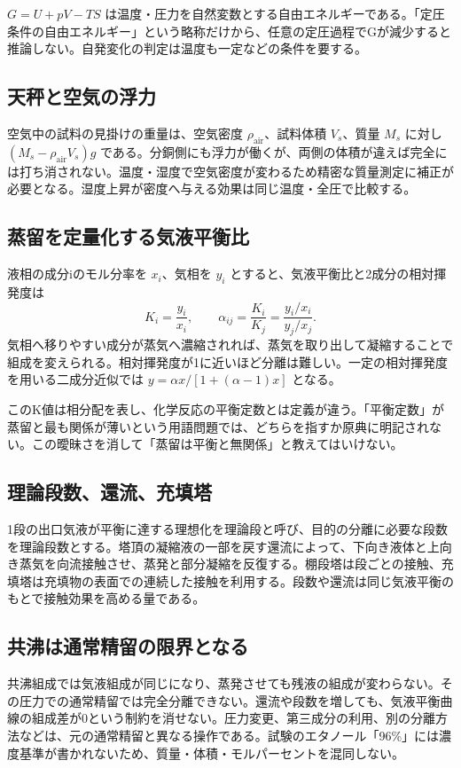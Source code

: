 \(G=U+pV-TS\) は温度・圧力を自然変数とする自由エネルギーである。「定圧条件の自由エネルギー」という略称だけから、任意の定圧過程でGが減少すると推論しない。自発変化の判定は温度も一定などの条件を要する\parencite{iupac_greenbook2012}。

\subsection{天秤と空気の浮力}
\label{theory:phase_sep:buoyancy}
空気中の試料の見掛けの重量は、空気密度 \(\rho_{\mathrm{air}}\)、試料体積 \(V_s\)、質量 \(M_s\) に対し \((M_s-\rho_{\mathrm{air}}V_s)g\) である。分銅側にも浮力が働くが、両側の体積が違えば完全には打ち消されない。温度・湿度で空気密度が変わるため精密な質量測定に補正が必要となる。湿度上昇が密度へ与える効果は同じ温度・全圧で比較する。

\subsection{蒸留を定量化する気液平衡比}
\label{theory:phase_sep:distillation}
液相の成分iのモル分率を \(x_i\)、気相を \(y_i\) とすると、気液平衡比と2成分の相対揮発度は
\[
 K_i=\frac{y_i}{x_i},\qquad
 \alpha_{ij}=\frac{K_i}{K_j}
 =\frac{y_i/x_i}{y_j/x_j}.
\]
気相へ移りやすい成分が蒸気へ濃縮されれば、蒸気を取り出して凝縮することで組成を変えられる。相対揮発度が1に近いほど分離は難しい。一定の相対揮発度を用いる二成分近似では \(y=\alpha x/[1+(\alpha-1)x]\) となる\parencite{nptel_distillation1}。

このK値は相分配を表し、化学反応の平衡定数とは定義が違う。「平衡定数」が蒸留と最も関係が薄いという用語問題では、どちらを指すか原典に明記されない。この曖昧さを消して「蒸留は平衡と無関係」と教えてはいけない。

\subsection{理論段数、還流、充填塔}
\label{theory:phase_sep:stages}
1段の出口気液が平衡に達する理想化を理論段と呼び、目的の分離に必要な段数を理論段数とする。塔頂の凝縮液の一部を戻す還流によって、下向き液体と上向き蒸気を向流接触させ、蒸発と部分凝縮を反復する。棚段塔は段ごとの接触、充填塔は充填物の表面での連続した接触を利用する。段数や還流は同じ気液平衡のもとで接触効果を高める量である。

\subsection{共沸は通常精留の限界となる}
\label{theory:phase_sep:azeotrope}
共沸組成では気液組成が同じになり、蒸発させても残液の組成が変わらない。その圧力での通常精留では完全分離できない\parencite{nptel_azeotrope}。還流や段数を増しても、気液平衡曲線の組成差が0という制約を消せない。圧力変更、第三成分の利用、別の分離方法などは、元の通常精留と異なる操作である。試験のエタノール「96\%」には濃度基準が書かれないため、質量・体積・モルパーセントを混同しない。

